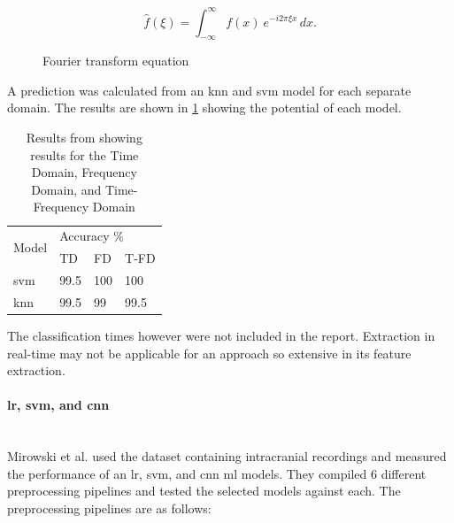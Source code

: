 \documentclass[12pt]{article}
\begin{document}
\begin{figure}[H]
\[ \widehat{f}(\xi) = \int_{-\infty}^{\infty} f(x)\ e^{-i 2\pi \xi x}\,dx. \]
\caption{Fourier transform equation}
\label{eq:fourier}
\end{figure}

A prediction was calculated from an \acrshort{knn} and \acrshort{svm} model for each separate domain. The results are shown in \ref{tab:svm_knn} showing the potential of each model.

\begin{table}[H]
\centering
\begin{tabular}{llll}
\multirow{2}{*}{Model}         & \multicolumn{3}{l}{Accuracy \%} \\
                               & TD & FD & T-FD\\
\protect\acrfull{svm} & 99.5        & 100              & 100                   \\
\protect\acrfull{knn} & 99.5        & 99               & 99.5                 
\end{tabular}
\caption{Results from \protect\cite{savadkoohi2020machine} showing results for the Time Domain, Frequency Domain, and Time-Frequency Domain}
\label{tab:svm_knn}
\end{table}

The classification times however were not included in the report. Extraction in real-time may not be applicable for an approach so extensive in its feature extraction. 

\paragraph{\acrfull{lr}, \acrfull{svm}, and \acrfull{cnn}}\mbox{}\\

Mirowski et al. used the \cite{freiburg_eeg} dataset containing intracranial recordings and measured the performance of an \acrshort{lr}, \acrshort{svm}, and \acrshort{cnn} \acrshort{ml} models. They compiled 6 different preprocessing pipelines and tested the selected models against each. The preprocessing pipelines are as follows: 
\end{document}

